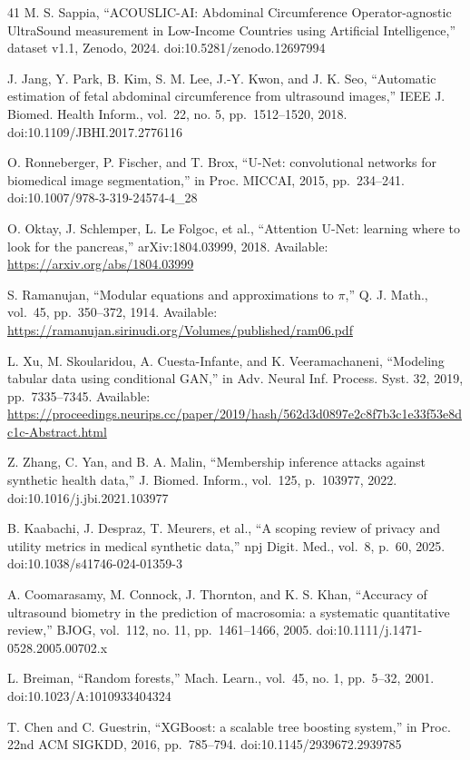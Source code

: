 \documentclass[conference]{IEEEtran}
\begin{document}
\begin{thebibliography}{41}
 M. S. Sappia, ``ACOUSLIC-AI: Abdominal Circumference Operator-agnostic UltraSound measurement in Low-Income Countries using Artificial Intelligence,'' dataset v1.1, Zenodo, 2024. doi:10.5281/zenodo.12697994

 J. Jang, Y. Park, B. Kim, S. M. Lee, J.-Y. Kwon, and J. K. Seo, ``Automatic estimation of fetal abdominal circumference from ultrasound images,'' IEEE J. Biomed. Health Inform., vol.~22, no. 5, pp.~1512--1520, 2018. doi:10.1109/JBHI.2017.2776116

 O. Ronneberger, P. Fischer, and T. Brox, ``U-Net: convolutional networks for biomedical image segmentation,'' in Proc. MICCAI, 2015, pp.~234--241. doi:10.1007/978-3-319-24574-4\_28

 O. Oktay, J. Schlemper, L. Le Folgoc, et al., ``Attention U-Net: learning where to look for the pancreas,'' arXiv:1804.03999, 2018. Available: \url{https://arxiv.org/abs/1804.03999}

 S. Ramanujan, ``Modular equations and approximations to \ensuremath{\pi},'' Q. J. Math., vol.~45, pp.~350--372, 1914. Available: \url{https://ramanujan.sirinudi.org/Volumes/published/ram06.pdf}

 L. Xu, M. Skoularidou, A. Cuesta-Infante, and K. Veeramachaneni, ``Modeling tabular data using conditional GAN,'' in Adv. Neural Inf. Process. Syst. 32, 2019, pp.~7335--7345. Available: \url{https://proceedings.neurips.cc/paper/2019/hash/562d3d0897e2c8f7b3c1e33f53e8dc1c-Abstract.html}

 Z. Zhang, C. Yan, and B. A. Malin, ``Membership inference attacks against synthetic health data,'' J. Biomed. Inform., vol.~125, p.~103977, 2022. doi:10.1016/j.jbi.2021.103977

 B. Kaabachi, J. Despraz, T. Meurers, et al., ``A scoping review of privacy and utility metrics in medical synthetic data,'' npj Digit. Med., vol.~8, p.~60, 2025. doi:10.1038/s41746-024-01359-3

 A. Coomarasamy, M. Connock, J. Thornton, and K. S. Khan, ``Accuracy of ultrasound biometry in the prediction of macrosomia: a systematic quantitative review,'' BJOG, vol.~112, no. 11, pp.~1461--1466, 2005. doi:10.1111/j.1471-0528.2005.00702.x

 L. Breiman, ``Random forests,'' Mach. Learn., vol.~45, no. 1, pp.~5--32, 2001. doi:10.1023/A:1010933404324

 T. Chen and C. Guestrin, ``XGBoost: a scalable tree boosting system,'' in Proc. 22nd ACM SIGKDD, 2016, pp.~785--794. doi:10.1145/2939672.2939785


\end{thebibliography}
\end{document}
